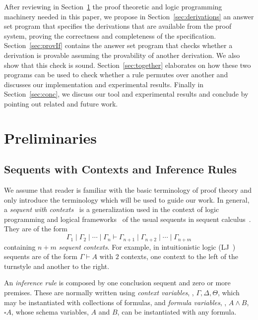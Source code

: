 \documentclass{new_tlp}
\begin{document}
After reviewing  in Section~\ref{sec:prelim} the proof theoretic and logic programming machinery needed in 
this paper, we propose in Section~\ref{sec:derivations} an answer set program that specifies the derivations
that are available from the proof system, proving the correctness and completeness of the specification. 
Section~\ref{sec:provIf} contains the answer set program that checks whether a derivation is provable
assuming the provability of another derivation. We also show that this check is sound. Section~\ref{sec:together} elaborates
on how these two programs can be used to check whether a rule permutes over another and discusses our implementation 
and experimental results. Finally in Section~\ref{sec:conc}, we discuss our tool and experimental results 
and conclude by pointing out related and future work.

\vspace{-2mm}

\section{Preliminaries}
\label{sec:prelim}

\subsection{Sequents with Contexts and Inference Rules}
\label{sec:sequents}
We assume that reader is familiar with the basic terminology of proof theory and only
introduce the terminology which will be used to guide our work.
In general, a \emph{sequent with contexts}~\cite{andreoli92jlc} is a generalization used in the context of 
logic programming and logical frameworks~\cite{nigam10jar,cervesato02ic} of the usual sequents in 
sequent calculus~\cite{gentzen35}. They are of the form
\[
\Gamma_1 \mid \Gamma_2 \mid \cdots \mid \Gamma_n \vdash
\Gamma_{n + 1} \mid \Gamma_{n + 2} \mid \cdots \mid \Gamma_{n + m}
\]
containing $n + m$ \emph{sequent contexts}. 
For example, in intuitionistic logic (LJ~\cite{gentzen35}) sequents are of the form 
$\Gamma \vdash A$ with $2$ contexts, one context to the left of the turnstyle and another
to the right.

An \emph{inference rule} is composed by one conclusion sequent and zero or more 
premises. These are normally written using \emph{context variables}, 
\eg, $\Gamma, \Delta, \Theta$, which may be instantiated with collections of formulas, and 
\emph{formula variables}, 
\eg, $A\land B$, $\square A$, whose schema variables, $A$ and $B$, can be
instantiated with any formula. 
\end{document}
